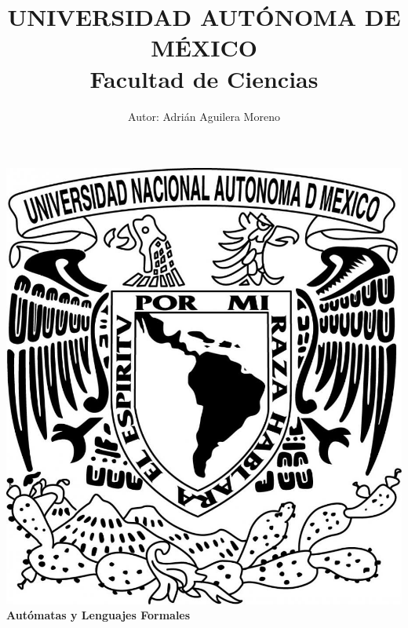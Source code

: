 \documentclass{article}
\begin{document}
\title{UNIVERSIDAD AUT\'ONOMA DE M\'EXICO\\ Facultad de Ciencias}
\author{Autor: Adri\'an Aguilera Moreno}
\date{}
\maketitle
\begin{center}
  \includegraphics[scale=0.20]{../Imagen/Portada.jpg}\\[0.4cm]
  \Large
  \bf{Aut\'omatas y Lenguajes Formales}
  \normalsize
\end{center}
\newpage
{}
\end{document}
